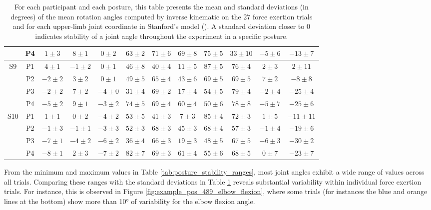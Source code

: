 \begin{table}[!ht]
{\begin{tabular}{|c|c||c|c|c|c|c|c|c|c|c|c|}
     & P4 & $1\pm 3$ & $8\pm 1$ & $0\pm 2$ & $63\pm 2$ & $71\pm 6$ & $69\pm 8$ & $75\pm 5$ & $33\pm 10$ & $-5\pm 6$ & $-13\pm 7$ \\
    \hline
    \hline
    \multirow{4}{*}{S9} & P1 & $4\pm 1$ & $-1\pm 2$ & $0\pm 1$ & $46\pm 8$ & $40\pm 4$ & $11\pm 5$ & $87\pm 5$ & $76\pm 4$ & $2\pm 3$ & $2\pm 11$ \\
     & P2 & $-2\pm 2$ & $3\pm 2$ & $0\pm 1$ & $49\pm 5$ & $65\pm 4$ & $43\pm 6$ & $69\pm 5$ & $69\pm 5$ & $7\pm 2$ & $-8\pm 8$ \\
     & P3 & $-2\pm 2$ & $7\pm 2$ & $-4\pm 0$ & $31\pm 4$ & $69\pm 2$ & $17\pm 4$ & $54\pm 5$ & $79\pm 4$ & $-2\pm 4$ & $-25\pm 4$ \\
     & P4 & $-5\pm 2$ & $9\pm 1$ & $-3\pm 2$ & $74\pm 5$ & $69\pm 4$ & $60\pm 4$ & $50\pm 6$ & $78\pm 8$ & $-5\pm 7$ & $-25\pm 6$ \\
    \hline
    \hline
    \multirow{4}{*}{S10} & P1 & $1\pm 1$ & $0\pm 2$ & $-4\pm 2$ & $53\pm 5$ & $41\pm 3$ & $7\pm 3$ & $85\pm 4$ & $72\pm 3$ & $1\pm 5$ & $-11\pm 11$ \\
     & P2 & $-1\pm 3$ & $-1\pm 1$ & $-3\pm 3$ & $52\pm 3$ & $68\pm 3$ & $45\pm 3$ & $68\pm 4$ & $57\pm 3$ & $-1\pm 4$ & $-19\pm 6$ \\
     & P3 & $-7\pm 1$ & $-4\pm 2$ & $-6\pm 2$ & $36\pm 4$ & $66\pm 3$ & $19\pm 3$ & $48\pm 5$ & $67\pm 5$ & $-6\pm 3$ & $-30\pm 2$ \\
     & P4 & $-8\pm 1$ & $2\pm 3$ & $-7\pm 2$ & $82\pm 7$ & $69\pm 3$ & $61\pm 4$ & $55\pm 6$ & $68\pm 5$ & $0\pm 7$ & $-23\pm 7$ \\
    \hline
    \end{tabular}}
    \caption{For each participant and each posture, this table presents the mean and standard deviations (in degrees) of the mean rotation angles computed by inverse kinematic on the 27 force exertion trials and for each upper-limb joint coordinate in Stanford's model (\cite{holzbaurModelUpperExtremity2005}). A standard deviation closer to $0$ indicates stability of a joint angle throughout the experiment in a specific posture.}
    \label{tab:posture_stability}
\end{table}

From the minimum and maximum values in Table \ref{tab:posture_stability_ranges}, most joint angles exhibit a wide range of values across all trials. Comparing these ranges with the standard deviations in Table \ref{tab:posture_stability} reveals substantial variability within individual force exertion trials. For instance, this is observed in Figure \ref{fig:example_pos_489_elbow_flexion}, where some trials (for instances the blue and orange lines at the bottom) show more than 10° of variability for the elbow flexion angle.


